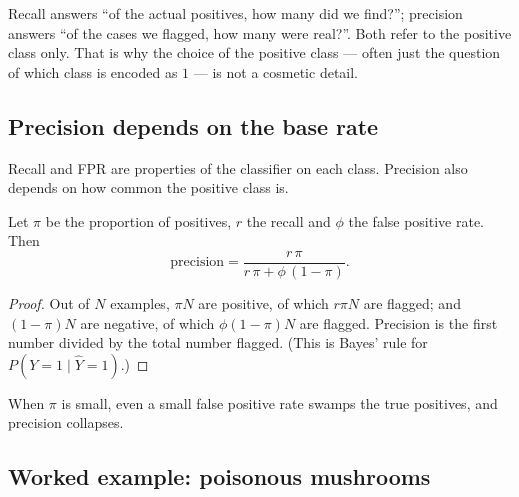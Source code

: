 \begin{notechapter}
Recall answers ``of the actual positives, how many did we find?''; precision
answers ``of the cases we flagged, how many were real?''. Both refer to the
positive class only. That is why the choice of the positive class --- often
just the question of which class is encoded as $1$ --- is not a cosmetic
detail.

\subsection{Precision depends on the base rate}

Recall and FPR are properties of the classifier on each class. Precision also
depends on how common the positive class is.

\begin{proposition}\label{measuring-performance:prop:prevalence}
Let $\pi$ be the proportion of positives, $r$ the recall and $\phi$ the false
positive rate. Then
\[
  \text{precision} = \frac{r\,\pi}{r\,\pi + \phi\,(1-\pi)} .
\]
\end{proposition}

\begin{proof}
Out of $N$ examples, $\pi N$ are positive, of which $r\pi N$ are flagged; and
$(1-\pi)N$ are negative, of which $\phi(1-\pi)N$ are flagged. Precision is the
first number divided by the total number flagged. (This is Bayes' rule for
$P(Y = 1\mid\hat Y = 1)$.)
\end{proof}

When $\pi$ is small, even a small false positive rate swamps the true
positives, and precision collapses.

\subsection{Worked example: poisonous mushrooms}\label{measuring-performance:sec:mushrooms}


\end{notechapter}
